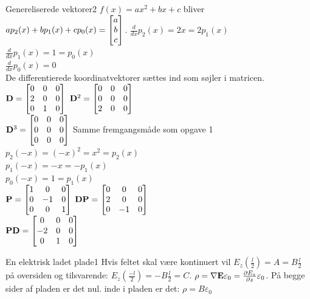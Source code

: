 \begin{opgave}{Genereliserede vektorer}{2}
\opg $f(x) = ax^2+bx+c$ bliver $ap_2(x)+bp_1(x)+cp_0(x) = \begin{bmatrix} a \\ b \\ c \end{bmatrix}$.
\opg $\frac{d}{dx}p_2(x) = 2x = 2p_1(x)$\\
$\frac{d}{dx}p_1(x) = 1 = p_0(x)$\\
$\frac{d}{dx}p_0(x) = 0$\\
De differentierede koordinatvektorer sættes ind som søjler i matricen.\\
$\mathbf{D} = \begin{bmatrix}
0&0&0\\
2&0&0\\
0&1&0
\end{bmatrix}
$
\opg $\mathbf{D}^2 = \begin{bmatrix}
0&0&0\\
0&0&0\\
2&0&0
\end{bmatrix}$\\
$\mathbf{D}^3 = \begin{bmatrix}
0&0&0\\
0&0&0\\
0&0&0
\end{bmatrix}$
\opg
Samme fremgangsmåde som opgave 1\\
$p_2(-x) = (-x)^2 = x^2=p_2(x)$\\
$p_1(-x) = -x = -p_1(x)$\\
$p_0(-x) = 1 =p_1(x)$\\
$\mathbf{P} = \begin{bmatrix}
1&0&0\\
0&-1&0\\
0&0&1
\end{bmatrix}$
\opg
$\mathbf{D} \mathbf{P}=\begin{bmatrix}
0&0&0\\
2&0&0\\
0&-1&0
\end{bmatrix}$\\
$\mathbf{P}\mathbf{D} = \begin{bmatrix}
0&0&0\\
-2&0&0\\
0&1&0
\end{bmatrix}$
\end{opgave}

\begin{opgave}{En elektrisk ladet plade}{1}
\opg Hvis feltet skal være kontinuert vil $E_z\left(\frac{l}{2}\right)=A=B\frac{l}{2}$ på oversiden og tilsvarende: $E_z\left(\frac{-l}{2}\right)=-B\frac{l}{2}=C$.
\opg $\rho = \mathbf{\nabla} \mathbf{E} \varepsilon_0 = \frac{\partial E_z}{\partial z}\varepsilon_0$. På begge sider af pladen er det nul. inde i pladen er det: $\rho = B\varepsilon_0$
\end{opgave}

